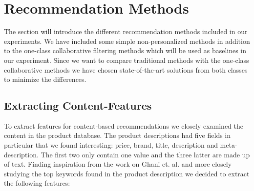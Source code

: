 
\section{Recommendation Methods}
\label{sec:rec-models}

The section will introduce the different recommendation methods included in our
experiments. We have included some simple non-personalized methods in addition
to the one-class collaborative filtering methods which will be used as baselines in
our experiment. Since we want to compare traditional methods with the one-class
collaborative methods we have chosen state-of-the-art solutions from both classes
to minimize the differences.




\subsection{Extracting Content-Features}

To extract features for content-based recommendations we closely examined the content in the product database.
The product descriptions had five fields in particular that we found interesting: price, brand, title, description
and meta-description. The first two only contain one value and the three latter are made up of text.
Finding inspiration from the work on Ghani et. al. \cite{ghani2002building} and more closely studying the top keywords
found in the product description we decided to extract the following features:


